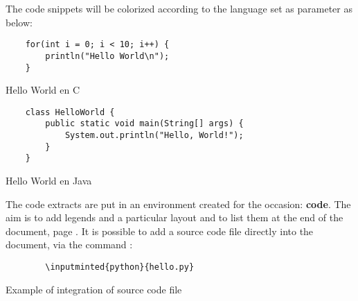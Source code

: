 The code snippets will be colorized according to the language set as parameter as below:

\begin{code}
    \begin{verbatim}
    for(int i = 0; i < 10; i++) {
        println("Hello World\n");
    }
\end{verbatim}
    \caption{Hello World en C}
\end{code}

\begin{code}
    \begin{verbatim}
    class HelloWorld {
        public static void main(String[] args) {
            System.out.println("Hello, World!");
        }
    }
\end{verbatim}
    \caption{Hello World en Java}
\end{code}

The code extracts are put in an environment created for the occasion: \textbf{code}.
The aim is to add legends and a particular layout and to list them at the end of the document,
page \pageref{TableOfCode}.
It is possible to add a source code file directly into the document, via the command :
\begin{code}
    \begin{verbatim}
        \inputminted{python}{hello.py}
\end{verbatim}
    \caption{Example of integration of source code file}
\end{code}

